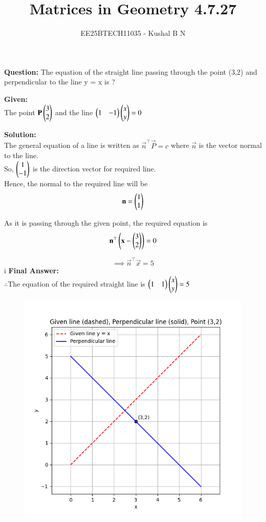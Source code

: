 \documentclass[journal,12pt,onecolumn]{IEEEtran}
\title{Matrices in Geometry 4.7.27}
\author{EE25BTECH11035 - Kushal B N}
\theoremstyle{remark}
\begin{document}
\vspace{3cm}
\maketitle
{\let\newpage\relax\maketitle}
\textbf{Question: }
The equation of the straight line passing through the point (3,2) and perpendicular to the line y = x is ?

\textbf{Given: } \\
The point $\mathbf{P}\begin{pmatrix}3\\2\end{pmatrix}$ and the line $\begin{pmatrix}1&-1\end{pmatrix}\begin{pmatrix}x\\y\end{pmatrix} = 0$

\textbf{Solution: }\\
The general equation of a line is written as $\vec{n}^{\top}\vec{P}=c$ where $\vec{n}$ is the vector normal to the line.\\
So, $\begin{pmatrix}1\\-1\end{pmatrix}$ is the direction vector for required line.\\
Hence, the normal to the required line will be 
\begin{equation}
    \mathbf{n} = \begin{pmatrix}1\\1\end{pmatrix}
\end{equation}

As it is passing through the given point, the required equation is
\begin{equation}
    \mathbf{n}^{\top}\left(\mathbf{x}-\begin{pmatrix}3\\2\end{pmatrix}\right) = 0
\end{equation}

\begin{equation}
    \implies \vec{n}^{\top}\vec{x} = 5
\end{equation}
i
\textbf{Final Answer: }\\
$\therefore$The equation of the required straight line is $\begin{pmatrix}1&1\end{pmatrix}\begin{pmatrix}x\\y\end{pmatrix}=5$

\begin{figure}[H]
    \centering
    \includegraphics[width=0.55\columnwidth]{figs/2.png}
    \caption{}
\end{figure}
\end{document}
